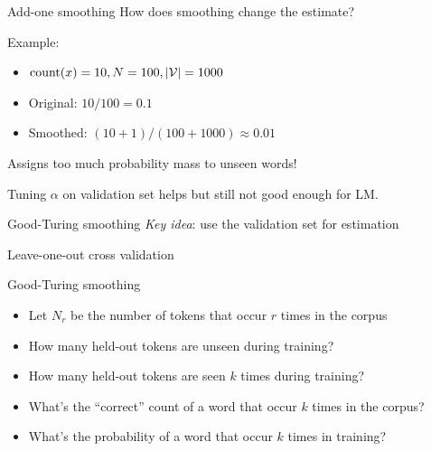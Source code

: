 \documentclass[usenames,dvipsnames,notes]{beamer}
\begin{document}
\begin{frame}
    {Add-one smoothing}
    How does smoothing change the estimate?

    Example:\\
    \begin{itemize}
        \item[] $\text{count}(x)=10, N=100, |\mathcal{V}|=1000$
        \item[] Original: $10/100=0.1$
        \item[] Smoothed: $(10+1)/(100+1000)\approx 0.01$
    \end{itemize}

    Assigns too much probability mass to unseen words!

    Tuning $\alpha$ on validation set helps but still not good enough for LM.
\end{frame}

\begin{frame}
    {Good-Turing smoothing}
    \emph{Key idea}: use the validation set for estimation\\
    \vspace{5em}

    Leave-one-out cross validation\\
    \vspace{8em}

\end{frame}

\begin{frame}
    {Good-Turing smoothing}
    \begin{itemize}
        \item Let $N_r$ be the number of tokens that occur $r$ times in the corpus
        \item How many held-out tokens are unseen during training? 
            \vspace{2em}
        \item How many held-out tokens are seen $k$ times during training? 
            \vspace{2em}
        \item What's the ``correct'' count of a word that occur $k$ times in the corpus?
            \vspace{2em}
        \item What's the probability of a word that occur $k$ times in training?
            \vspace{2em}
    \end{itemize}
\end{frame}
\end{document}
